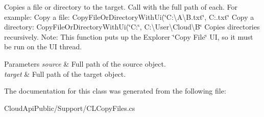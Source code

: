 Copies a file or directory to the target. Call with the full path of each. For example\-: Copy a file\-: Copy\-File\-Or\-Directory\-With\-Ui(\char`\"{}\-C\-:\textbackslash{}\-A\textbackslash{}\-B.\-txt\char`\"{}, C\-:.txt\char`\"{}
  Copy a directory\-: Copy\-File\-Or\-Directory\-With\-Ui(\char`\"{}C\-:\char`\"{}, C\-:\textbackslash{}\-User\textbackslash{}\-Cloud\textbackslash{}\-B\char`\"{} Copies directories recursively. Note\-: This function puts up the Explorer \char`\"{}\-Copy File\char`\"{} U\-I, so it must be run on the U\-I thread. 


\begin{DoxyParams}{Parameters}
{\em source} & Full path of the source object.\\
\hline
{\em target} & Full path of the target object.\\
\hline
\end{DoxyParams}


The documentation for this class was generated from the following file\-:\begin{DoxyCompactItemize}
\item 
Cloud\-Api\-Public/\-Support/C\-L\-Copy\-Files.\-cs\end{DoxyCompactItemize}
